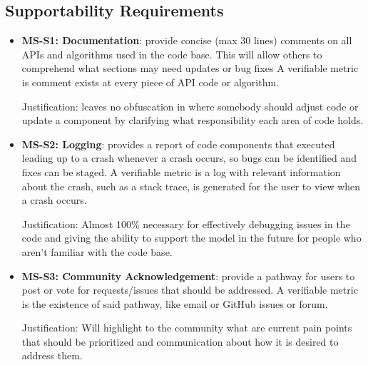 \documentclass[12pt]{article}
\begin{document}
\subsection{Supportability Requirements}
\begin{itemize}
    \item \textbf{MS-S1: Documentation}: provide concise (max 30 lines) comments on 
    all APIs and algorithms used in the code base. This will allow others to 
    comprehend what sections may need updates or bug fixes A verifiable metric is 
    comment exists at every piece of API code or algorithm.
    
    Justification: leaves no obfuscation in where somebody should adjust 
    code or update a component by clarifying what responsibility each area
     of code holds.

    \item \textbf{MS-S2: Logging}: provides a report of code components that 
    executed leading up to a crash whenever a crash occurs, so bugs can 
    be identified and fixes can be staged. A verifiable metric is a log with relevant 
    information about the crash, such as a stack trace, is generated for the user 
    to view when a crash occurs.

    Justification: Almost 100\% necessary for effectively debugging issues in
     the code and giving the ability to support the model in the future for 
     people who aren't familiar with the code base.

    \item \textbf{MS-S3: Community Acknowledgement}: provide a pathway for users to post
     or vote for requests/issues that should be addressed. A verifiable metric is the existence
      of said pathway, like email or GitHub issues or forum.

    Justification: Will highlight to the community what are current pain points 
    that should be prioritized and communication about how it is desired to 
    address them.

\end{itemize}
\end{document}
